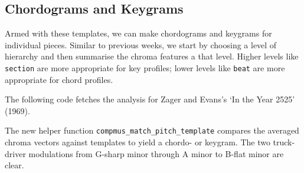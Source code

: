 \documentclass[]{article}
\newenvironment{Shaded}{\begin{snugshade}}{\end{snugshade}}
\newcommand{\DataTypeTok}[1]{\textcolor[rgb]{0.13,0.29,0.53}{#1}}
\newcommand{\KeywordTok}[1]{\textcolor[rgb]{0.13,0.29,0.53}{\textbf{#1}}}
\newcommand{\NormalTok}[1]{#1}
\newcommand{\OperatorTok}[1]{\textcolor[rgb]{0.81,0.36,0.00}{\textbf{#1}}}
\newcommand{\StringTok}[1]{\textcolor[rgb]{0.31,0.60,0.02}{#1}}
\begin{document}
\hypertarget{chordograms-and-keygrams}{%
\subsection{Chordograms and Keygrams}\label{chordograms-and-keygrams}}

Armed with these templates, we can make chordograms and keygrams for
individual pieces. Similar to previous weeks, we start by choosing a
level of hierarchy and then summarise the chroma features a that level.
Higher levels like \texttt{section} are more appropriate for key
profiles; lower levels like \texttt{beat} are more appropriate for chord
profiles.

The following code fetches the analysis for Zager and Evans's `In the
Year 2525' (1969).

\begin{Shaded}
\end{Shaded}

The new helper function \texttt{compmus\_match\_pitch\_template}
compares the averaged chroma vectors against templates to yield a
chordo- or keygram. The two truck-driver modulations from G-sharp minor
through A minor to B-flat minor are clear.
\end{document}
